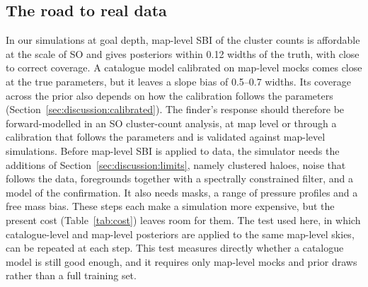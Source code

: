 \subsection{The road to real data}\label{sec:discussion:road}

In our simulations at goal depth, map-level SBI of the cluster counts is affordable at the scale of SO and
gives posteriors within 0.12 widths of the truth, with close to correct coverage. A catalogue model
calibrated on map-level mocks comes close at the true parameters, but it leaves a slope bias of 0.5--0.7 widths. Its coverage across the prior also depends on how the calibration follows the parameters
(Section~\ref{sec:discussion:calibrated}). The finder's response should therefore be forward-modelled in
an SO cluster-count analysis, at map level or through a calibration that follows the parameters and is
validated against map-level simulations. Before map-level SBI is applied to data, the simulator needs the
additions of Section~\ref{sec:discussion:limits}, namely clustered haloes, noise that follows the data,
foregrounds together with a spectrally constrained filter, and a model of the confirmation. It also needs
masks, a range of pressure profiles and a free mass bias. These steps each make a simulation more expensive, but the present cost (Table~\ref{tab:cost}) leaves room for them. The test used
here, in which catalogue-level and map-level posteriors are applied to the same map-level skies, can be
repeated at each step. This test measures directly whether a catalogue model is still good enough, and it
requires only map-level mocks and prior draws rather than a full training set.
